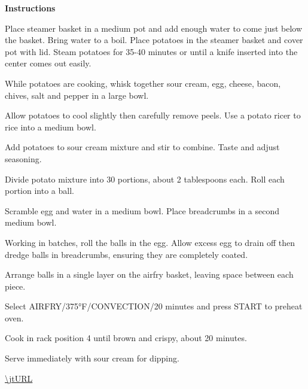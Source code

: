 \documentclass[../book.tex]{subfiles}
\begin{document}
  \begin{minipage}[t]{0.6\textwidth}
    {\bfseries\large Instructions}
    \begin{myMethod}
      \item Place steamer basket in a medium pot and add enough water to come just below the basket. Bring water to a boil. Place potatoes in the steamer basket and cover pot with lid. Steam potatoes for 35-40 minutes or until a knife inserted into the center comes out easily.
      \item While potatoes are cooking, whisk together sour cream, egg, cheese, bacon, chives, salt and pepper in a large bowl.
      \item Allow potatoes to cool slightly then carefully remove peels. Use a potato ricer to rice into a medium bowl.
      \item Add potatoes to sour cream mixture and stir to combine. Taste and adjust seasoning.
      \item Divide potato mixture into 30 portions, about 2 tablespoons each. Roll each portion into a ball.
      \item Scramble egg and water in a medium bowl. Place breadcrumbs in a second medium bowl.
      \item Working in batches, roll the balls in the egg. Allow excess egg to drain off then dredge balls in breadcrumbs, ensuring they are completely coated.
      \item Arrange balls in a single layer on the airfry basket, leaving space between each piece.
      \item Select AIRFRY/375°F/CONVECTION/20 minutes and press START to preheat oven.
      \item Cook in rack position 4 until brown and crispy, about 20 minutes.
      \item Serve immediately with sour cream for dipping.
      \end{myMethod}
      \vspace{1ex}
    \end{minipage}
\vfill
\centering\url{\jtURL}
\end{document}
